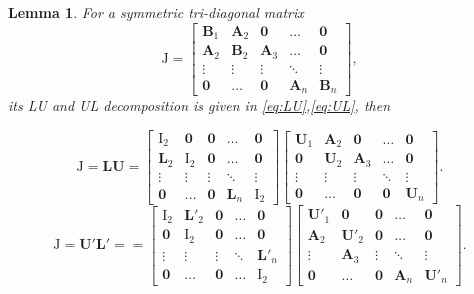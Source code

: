 \documentclass[conference]{IEEEtran}
\newtheorem{lemma}{Lemma}
\begin{document}
\begin{lemma}\label{lemma:1}
For a symmetric tri-diagonal matrix
\[
\bm{\mathrm{J}}=\begin{bmatrix}
                 \bm{B}_1 & \bm{A}_2 & \bm{0} & \dots & \bm{0} \\
                 \bm{A}_2 & \bm{B}_2 & \bm{A}_3 & \dots & \bm{0} \\
                 \vdots & \vdots & \vdots & \ddots & \vdots \\
                 \bm{0} & \dots & \bm{0} & \bm{A}_{n} & \bm{B}_{n}
               \end{bmatrix},
\] its LU and UL decomposition is given in \eqref{eq:LU},\eqref{eq:UL}, then 
\begin{figure}[!t]
\begin{equation}\label{eq:LU}
\bm{\mathrm{J}}=\bm{L}\bm{U}=
\begin{bmatrix}
                 \bm{\mathrm{I}}_2 & \bm{0} & \bm{0} & \dots & \bm{0} \\
                 \bm{L}_2 & \bm{\mathrm{I}}_2 & \bm{0} & \dots & \bm{0} \\
                 \vdots & \vdots & \vdots & \ddots & \vdots \\
                 \bm{0} & \dots & \bm{0} & \bm{L}_{n} & \bm{\mathrm{I}}_{2}
               \end{bmatrix}\begin{bmatrix}
                 \bm{U}_1 & \bm{A}_2 & \bm{0} & \dots & \bm{0} \\
                 \bm{0} & \bm{U}_2 & \bm{A}_3 & \dots & \bm{0} \\
                 \vdots & \vdots & \vdots & \ddots & \vdots \\
                 \bm{0} & \dots & \bm{0} & \bm{0} & \bm{U}_{n}
               \end{bmatrix}.
\end{equation}
\begin{equation}\label{eq:UL}
\bm{\mathrm{J}}=\bm{U}'\bm{L}'==\begin{bmatrix}
                 \bm{\mathrm{I}}_2 & \bm{L'}_2 & \bm{0} & \dots & \bm{0} \\
                 \bm{0} & \bm{\mathrm{I}}_2 & \bm{0} & \dots & \bm{0} \\
                 \vdots & \vdots & \vdots & \ddots & \bm{L'}_{n} \\
                 \bm{0} & \dots & \bm{0} & \dots & \bm{\mathrm{I}}_{2}
               \end{bmatrix}
               \begin{bmatrix}
                 \bm{U'}_1 & \bm{0} & \bm{0} & \dots & \bm{0} \\
                 \bm{A}_2 & \bm{U'}_2 & \bm{0} & \dots & \bm{0} \\
                 \vdots & \bm{A}_3 & \vdots & \ddots & \vdots \\
                 \bm{0} & \dots & \bm{0} & \bm{A}_n & \bm{U'}_{n}
               \end{bmatrix}.
\end{equation}
\hrulefill
\end{figure}


\end{lemma}
\end{document}
